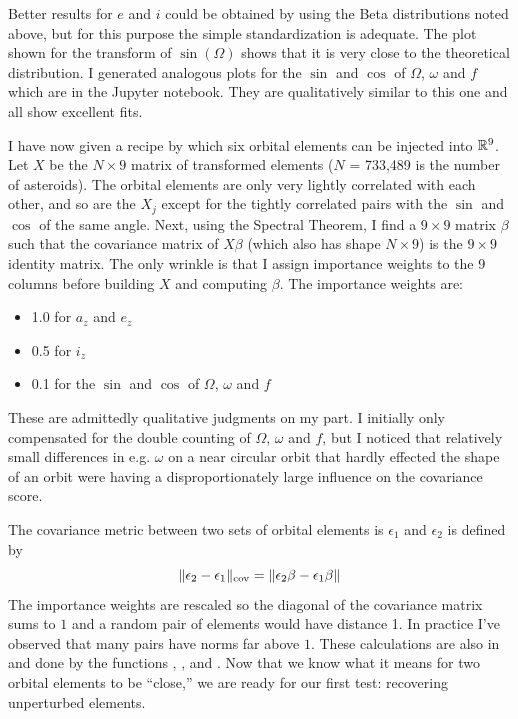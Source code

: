 Better results for $e$ and $i$ could be obtained by using the Beta distributions noted above, but for this purpose the simple standardization is adequate.
The plot shown for the transform of $\sin(\Omega)$ shows that it is very close to the theoretical distribution.
I generated analogous plots for the $\sin$ and $\cos$ of $\Omega$, $\omega$ and $f$ which are in the Jupyter notebook.
They are qualitatively similar to this one and all show excellent fits.

I have now given a recipe by which six orbital elements can be injected into $\mathbb{R}^{9}$.
Let $X$ be the $N \times 9$ matrix of transformed elements ($N$ = 733,489 is the number of asteroids).
The orbital elements are only very lightly correlated with each other, 
and so are the $X_j$ except for the tightly correlated pairs with the $\sin$ and $\cos$ of the same angle.
Next, using the Spectral Theorem, I find a $9 \times 9$ matrix $\beta$ such that the covariance matrix of $X \beta$  
(which also has shape $N \times 9$) is the $9 \times 9$ identity matrix.
The only wrinkle is that I assign importance weights to the 9 columns before building $X$ and computing $\beta$.
The importance weights are:
\begin{itemize}
\item 1.0 for $a_z$ and $e_z$
\item 0.5 for $i_z$
\item 0.1 for the $\sin$ and $\cos$ of $\Omega$, $\omega$ and $f$
\end{itemize}
These are admittedly qualitative judgments on my part. 
I initially only compensated for the double counting of $\Omega$, $\omega$ and $f$, 
but I noticed that relatively small differences in e.g. $\omega$ on a near circular orbit that hardly effected the shape of an orbit
were having a disproportionately large influence on the covariance score.

The covariance metric between two sets of orbital elements is $\epsilon_1$ and $\epsilon_2$ is defined by
$$ \lVert\epsilon_2 - \epsilon_1\rVert_{\mathrm{cov}} = \lVert\epsilon_2 \beta - \epsilon_1 \beta\rVert $$
The importance weights are rescaled so the diagonal of the covariance matrix sums to $1$ and a random pair of elements would have distance 1.
In practice I've observed that many pairs have norms far above $1$.
These calculations are also in  and done by the 
functions , ,  and .
Now that we know what it means for two orbital elements to be ``close,'' 
we are ready for our first test: recovering unperturbed elements.

